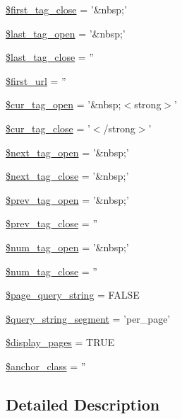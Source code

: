 \begin{DoxyCompactItemize}
\item 
\hyperlink{class_c_i___pagination_a1aa5f33d3f661838fa1f8482128a19c7}{\$first\-\_\-tag\-\_\-close} = '\&nbsp;'
\item 
\hyperlink{class_c_i___pagination_ac7e807e8227dd4528c2b315424d126db}{\$last\-\_\-tag\-\_\-open} = '\&nbsp;'
\item 
\hyperlink{class_c_i___pagination_a8e024740710598d97da42739bd231dda}{\$last\-\_\-tag\-\_\-close} = ''
\item 
\hyperlink{class_c_i___pagination_ac7fe85e2fda76364772be52656e346b8}{\$first\-\_\-url} = ''
\item 
\hyperlink{class_c_i___pagination_a60f0f6e2515e166fa11657186b39345d}{\$cur\-\_\-tag\-\_\-open} = '\&nbsp;$<$strong$>$'
\item 
\hyperlink{class_c_i___pagination_a8f284fc318c9b1a0d20e5aa53cdbb540}{\$cur\-\_\-tag\-\_\-close} = '$<$/strong$>$'
\item 
\hyperlink{class_c_i___pagination_a0345e4646ae630d4d95f98de048e4572}{\$next\-\_\-tag\-\_\-open} = '\&nbsp;'
\item 
\hyperlink{class_c_i___pagination_aa3dc112ae0edd3eb76d13eb3f5a57d02}{\$next\-\_\-tag\-\_\-close} = '\&nbsp;'
\item 
\hyperlink{class_c_i___pagination_ab8f96d2bdfd51057db368d8ffd57ca5c}{\$prev\-\_\-tag\-\_\-open} = '\&nbsp;'
\item 
\hyperlink{class_c_i___pagination_abb46001ebebf96f2562ea1f8ced80aa1}{\$prev\-\_\-tag\-\_\-close} = ''
\item 
\hyperlink{class_c_i___pagination_a1227a094532251dca78e533d9b9f068f}{\$num\-\_\-tag\-\_\-open} = '\&nbsp;'
\item 
\hyperlink{class_c_i___pagination_ab84030017256e7345316413cfefd41a5}{\$num\-\_\-tag\-\_\-close} = ''
\item 
\hyperlink{class_c_i___pagination_a2721bf5c6a50b356b53f1c1bdb9d139e}{\$page\-\_\-query\-\_\-string} = F\-A\-L\-S\-E
\item 
\hyperlink{class_c_i___pagination_a8fe6ddd39110b4952ddcca9bba07c019}{\$query\-\_\-string\-\_\-segment} = 'per\-\_\-page'
\item 
\hyperlink{class_c_i___pagination_ab68f1bc9a7442f1936286f05b7ba175d}{\$display\-\_\-pages} = T\-R\-U\-E
\item 
\hyperlink{class_c_i___pagination_a6e44d84fef9aa8b966899c447120fd3a}{\$anchor\-\_\-class} = ''
\end{DoxyCompactItemize}


\subsection{Detailed Description}


